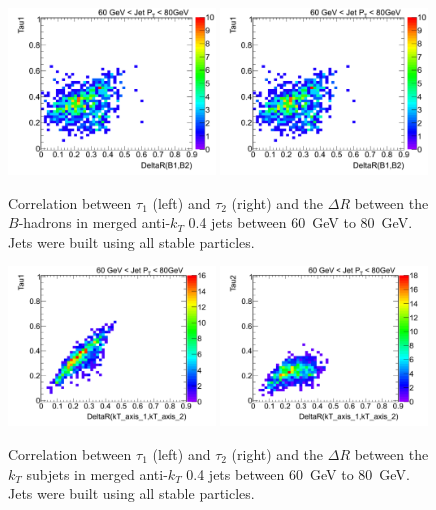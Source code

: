 \begin{figure}[tp]
\centering
\includegraphics[width=0.49\textwidth]{FIGS/TEMPFigs/PythisStandalone/Antikt4/allparticles/Tau1DeltaRCorr_PT60.pdf}
\includegraphics[width=0.49\textwidth]{FIGS/TEMPFigs/PythisStandalone/Antikt4/allparticles/Tau1DeltaRCorr_PT60.pdf}
\caption{Correlation between $\tau_1$ (left) and $\tau_2$ (right) and the $\Delta R$ between the $B$-hadrons in merged anti-$k_T$ 0.4 jets  between 60~GeV to 80~GeV. Jets were built using all stable particles.}
\label{fig:CorrTau1Tau2DRBB}
\end{figure}

\begin{figure}[tp]
\centering
\includegraphics[width=0.49\textwidth]{FIGS/TEMPFigs/PythisStandalone/Antikt4/allparticles/Tau1DRkT2axesCorr_PT60_merged.pdf}
\includegraphics[width=0.49\textwidth]{FIGS/TEMPFigs/PythisStandalone/Antikt4/allparticles/Tau2DRkT2axesCorr_PT60_merged.pdf}
\caption{Correlation between $\tau_1$ (left) and $\tau_2$ (right) and the $\Delta R$ between the $k_T$ subjets in merged anti-$k_T$ 0.4 jets  between 60~GeV to 80~GeV. Jets were built using all stable particles.}
\label{fig:CorrTau1Tau2DRkt}
\end{figure}


